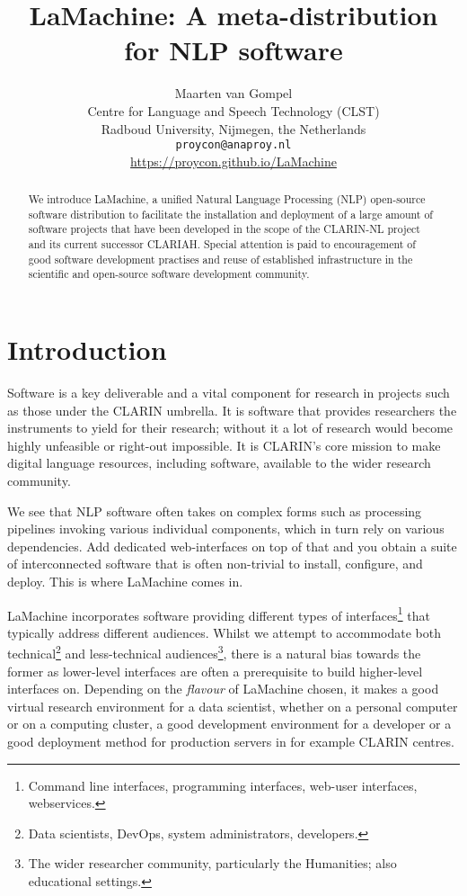 \documentclass[a4paper,11pt]{article}
\title{LaMachine: A meta-distribution for NLP software}
\author{Maarten van Gompel \\
  Centre for Language and Speech Technology (CLST) \\
  Radboud University, Nijmegen, the Netherlands \\
  {\tt proycon@anaproy.nl} \\ %
  \url{https://proycon.github.io/LaMachine}
}
\date{}
\begin{document}
\maketitle

\begin{abstract}
We introduce LaMachine, a unified Natural Language Processing (NLP) open-source software distribution to facilitate the
installation and deployment of a large amount of software projects that have been developed in the scope of the
CLARIN-NL project and its current successor CLARIAH. Special attention is paid to encouragement of good software
development practises and reuse of established infrastructure in the scientific and open-source software development
community.
\end{abstract}

\section{Introduction} \label{intro}

Software is a key deliverable and a vital component for research in projects such as those under the CLARIN umbrella. It
is software that provides researchers the instruments to yield for their research; without it a lot of research would
become highly unfeasible or right-out impossible. It is CLARIN's core mission to make digital language resources,
including software, available to the wider research community.

We see that NLP software often takes on complex forms such as processing pipelines invoking various individual
components, which in turn rely on various dependencies. Add dedicated web-interfaces on top of that and you obtain a
suite of interconnected software that is often non-trivial to install, configure, and deploy. This is where LaMachine
comes in.

LaMachine incorporates software providing different types of interfaces\footnote{Command line interfaces, programming
interfaces, web-user interfaces, webservices.} that typically address different audiences. Whilst we attempt to
accommodate both technical\footnote{Data scientists, DevOps, system administrators, developers.} and less-technical
audiences\footnote{The wider researcher community, particularly the Humanities; also educational settings.}, there is a natural bias towards the former as
lower-level interfaces are often a prerequisite to build higher-level interfaces on. Depending on the \emph{flavour} of
LaMachine chosen, it makes a good virtual research environment for a data scientist, whether on a personal computer or on a computing
cluster, a good development environment for a developer or a good deployment method for production servers in for
example CLARIN centres.
\end{document}
